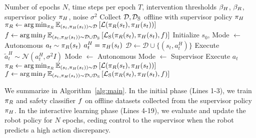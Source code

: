 \begin{algorithm}[t]
\caption{\algname}
\label{alg:main}
\footnotesize
\begin{algorithmic}[1]
\Require Number of epochs $N$, time steps per epoch $T$, intervention thresholds $\beta_{H}$, $\beta_{R}$, supervisor policy $\pi_{H}$, noise $\sigma^2$ %
\State Collect ${\mathcal{D}}, \mathcal{D}_{\rm S}$ offline with supervisor policy $\pi_{H}$
\State $\pi_{R} \leftarrow \arg\min_{\pi_{R}} \mathbb{E}_{(s_t, \pi_{H}(s_t))\sim\mathcal{D}}\left[\mathcal{L}(\pi_{R}(s_t),\pi_{H}(s_t))\right]$ 
\State $f \leftarrow \arg\min_{f} \mathbb{E}_{(s_t, \pi_{H}(s_t))\sim\mathcal{D}\cup\mathcal{D}_{\rm S}} \left[\mathcal{L}_{\rm S}(\pi_{R}(s_t),\pi_{H}(s_t),f)\right]$ 
    \State Initialize $s_0$, Mode $\gets$ Autonomous
        \State $a_t \sim \pi_{R}(s_t)$
            \State $a^H_t = \pi_{H}(s_t)$
            \State $\mathcal{D} \leftarrow \mathcal{D} \cup \{(s_t, a_t^H)\}$
            \State Execute $\tilde{a}^H_t \sim \mathcal{N}(a^H_t,\sigma^2I)$ \label{lin:noise}
                \State Mode $\gets$ Autonomous
            \Else
                \State Mode $\gets$ Supervisor
            \EndIf
        \Else
            \State Execute $a_{t}$
        \EndIf
    \EndFor
    \State $\pi_{R} \leftarrow \arg\min_{\pi_{R}} \mathbb{E}_{(s_t, \pi_{H}(s_t))\sim\mathcal{D}}\left[\mathcal{L}(\pi_{R}(s_t),\pi_{H}(s_t))\right]$
    \State $f \leftarrow \arg\min_{f} \mathbb{E}_{(s_t, \pi_{H}(s_t))\sim \mathcal{D}\cup \mathcal{D}_{\rm S}}\left[\mathcal{L}_{\rm S}(\pi_{R}(s_t),\pi_{H}(s_t),f)\right]$
\EndFor
\end{algorithmic}
\end{algorithm}

We summarize \algabbr in Algorithm~\ref{alg:main}. In the initial phase (Lines 1-3), we train $\pi_{R}$ and safety classifier $f$ on offline datasets collected from the supervisor policy $\pi_{H}$. In the interactive learning phase (Lines 4-19), we evaluate and update the robot policy for $N$ epochs, ceding control to the supervisor when the robot predicts a high action discrepancy.

